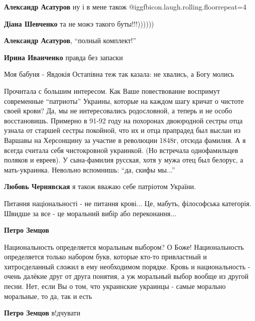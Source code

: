 \begin{itemize}
\begin{itemize}
\begin{itemize}
\textbf{Александр Асатуров} ну і в мене також @igg{fbicon.laugh.rolling.floor}{repeat=4} 

\textbf{Діана Шевченко} та не можэ такого буты!!!))))))

\textbf{Александр Асатуров}, \enquote{полный комплект!}

\textbf{Ирина Иванченко} правда без запаски
\end{itemize} %

\end{itemize} %

Моя бабуня - Явдокія Остапівна теж так казала: не хвались, а Богу молись


Прочитала с большим интересом. Как Ваше повествование воспримут современные
\enquote{патриоты} Украины, которые на каждом шагу кричат о чистоте своей крови? Да, мы
не интересовались родословной, а теперь и не особо восстановишь. Примерно в
91-92 году на похоронах двоюродной сестры отца узнала от старшей сестры
покойной, что их и отца прапрадед был выслан из Варшавы на Херсонщину за
участие в революции 1848г, отсюда фамилия. А я всегда считала себя чистокровной
украинкой. (Но встречала однофамильцев поляков и евреев). У сына-фамилия
русская, хотя у мужа отец был белорус, а мать-украинка. Невольно вспомнишь: \enquote{да,
скифы мы...}

\begin{itemize} %
\textbf{Любовь Чернявская} я також вважаю себе патріотом України.


Питання національності - не питання крові... Це, мабуть, філософська категорія.
Швидше за все - це моральний вибір або переконання...

\begin{itemize} %
\textbf{Петро Земцов} 

Национальность определяется моральным выбором? О Боже! Национальность
определяется только набором букв, которые кто-то привластный и хитросделанный
сложил в ему необходимом порядке. Кровь и национальность - очень далёкие друг
от друга понятия, а уж моральный выбор вообще из другой песни. Нет, если Вы о
том, что украинские украинцы - самые морально моральные, то да, так и есть

\textbf{Петро Земцов} в!дчувати
\end{itemize} %


\end{itemize}
\end{itemize}

